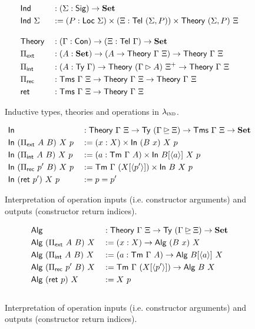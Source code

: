 \begin{figure}[H]
  \begin{alignat*}{2}
  & \Ind &&: (\Sigma : \Sig) \to \Set \\
  & \Ind\ \Sigma &&:= (P : \Loc\ \Sigma) \times (\Xi : \Tel\ (\Sigma, P)) \times \Theory\ (\Sigma, P)\ \Xi \\[1em]
  & \Theory &&: (\Gamma : \Con) \to (\Xi : \Tel\ \Gamma) \to \Set \\
  & \Pi_{\mta{ext}} &&: (A : \Set) \to (A \to \Theory\ \Gamma\ \Xi) \to \Theory\ \Gamma\ \Xi \\
  & \Pi_{\mta{int}} &&: (A : \Ty\ \Gamma) \to \Theory\ (\Gamma \rhd A)\ \Xi^+ \to \Theory\ \Gamma\ \Xi \\
  & \Pi_{\mta{rec}} &&: \Tms\ \Gamma\ \Xi \to \Theory\ \Gamma\ \Xi \to \Theory\ \Gamma\ \Xi \\
  & \mta{ret} &&: \Tms\ \Gamma\ \Xi \to \Theory\ \Gamma\ \Xi
  \end{alignat*}
  \caption{Inductive types, theories and operations in $\lambda_{\textsc{ind}}$.}
  \label{fig:lambdaind-inductive-theories}
\end{figure}

\begin{figure}[H]
  \begin{alignat*}{2}
  &\mta{In} &&: \Theory\ \Gamma\ \Xi \to \Ty\ (\Gamma \unrhd \Xi) \to \Tms\ \Gamma\ \Xi \to \Set \\
  &\mta{In}\ (\Pi_{\mta{ext}}\ A\ B)\ X\ p &&:= (x : X) \times \mta{In}\ (B\ x)\ X\ p \\
  &\mta{In}\ (\Pi_{\mta{int}}\ A\ B)\ X\ p &&:= (a : \Tm\ \Gamma\ A) \times \mta{In}\ B [\langle a \rangle]\ X\ p \\
  &\mta{In}\ (\Pi_{\mta{rec}}\ p'\ B)\ X\ p &&:= \Tm\ \Gamma\ (X [\langle p' \rangle]) \times \mta{In}\ B\ X\ p \\
  &\mta{In}\ (\mta{ret}\ p')\ X\ p &&:= p = p'
  \end{alignat*}
  \caption{Interpretation of operation inputs (i.e. constructor arguments) and outputs (constructor return indices).}
  \label{fig:lambdaind-operation-interp}
\end{figure}

\begin{figure}[H]
  \begin{alignat*}{2}
  &\mta{Alg} &&: \Theory\ \Gamma\ \Xi \to \Ty\ (\Gamma \unrhd \Xi) \to \Set \\
  &\mta{Alg}\ (\Pi_{\mta{ext}}\ A\ B)\ X &&:= (x : X) \to \mta{Alg}\ (B\ x)\ X \\
  &\mta{Alg}\ (\Pi_{\mta{int}}\ A\ B)\ X &&:= (a : \Tm\ \Gamma\ A) \to \mta{Alg}\ B [\langle a \rangle]\ X \\
  &\mta{Alg}\ (\Pi_{\mta{rec}}\ p'\ B)\ X &&:= \Tm\ \Gamma\ (X [\langle p' \rangle]) \to \mta{Alg}\ B\ X \\
  &\mta{Alg}\ (\mta{ret}\ p)\ X &&:= X\ p \\[1em]
  \end{alignat*}
  \caption{Interpretation of operation inputs (i.e. constructor arguments) and outputs (constructor return indices).}
\end{figure}

